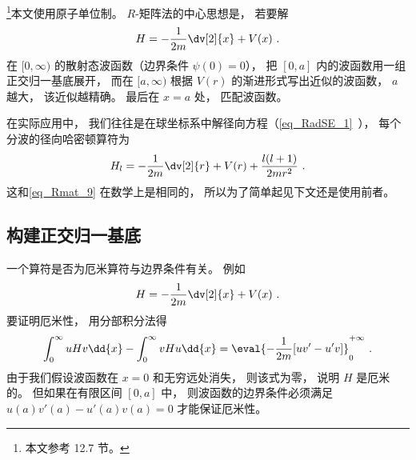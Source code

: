 

\footnote{本文参考 \cite{Bransden} 12.7 节。}本文使用原子单位制。 $R$-矩阵法的中心思想是， 若要解
\begin{equation}\label{eq_Rmat_9}
H = -\frac{1}{2m}\dv[2]{x} + V(x)~.
\end{equation}
在 $[0, \infty)$ 的散射态波函数（边界条件 $\psi(0) = 0$）， 把 $[0,a]$ 内的波函数用一组正交归一基底展开， 而在 $[a,\infty)$ 根据 $V(r)$ 的渐进形式写出近似的波函数， $a$ 越大， 该近似越精确。 最后在 $x=a$ 处， 匹配波函数。

在实际应用中， 我们往往是在球坐标系中解径向方程（\autoref{eq_RadSE_1}~）， 每个分波的径向哈密顿算符为
\begin{equation}
H_l = -\frac{1}{2m} \dv[2]{r} + V(r) + \frac{l(l + 1)}{2mr^2}~.
\end{equation}
这和\autoref{eq_Rmat_9} 在数学上是相同的， 所以为了简单起见下文还是使用前者。

\subsection{构建正交归一基底}
一个算符是否为厄米算符与边界条件有关。 例如
\begin{equation}
H = -\frac{1}{2m}\dv[2]{x} + V(x)~.
\end{equation}
要证明厄米性， 用分部积分法得
\begin{equation}\label{eq_Rmat_1}
\int_{0}^{\infty} uHv\dd{x} - \int_{0}^{\infty} vHu\dd{x}
= \eval{-\frac{1}{2m}[uv' - u'v]}_{0}^{+\infty}~.
\end{equation}
由于我们假设波函数在 $x=0$ 和无穷远处消失， 则该式为零， 说明 $H$ 是厄米的。 但如果在有限区间 $[0, a]$ 中， 则波函数的边界条件必须满足 $u(a)v'(a) - u'(a)v(a) = 0$ 才能保证厄米性。

